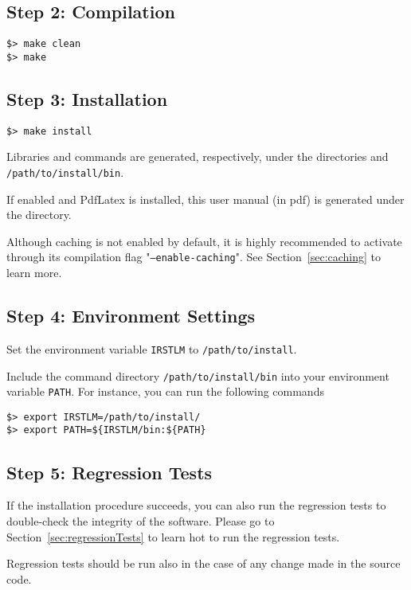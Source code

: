 \subsection{Step 2: Compilation}

\begin{verbatim}
$> make clean
$> make
\end{verbatim}

\subsection{Step 3: Installation}
\begin{verbatim}
$> make install
\end{verbatim}

\noindent
Libraries and commands are generated,  respectively, under the directories and {\tt /path/to/install/bin}.

\noindent
If enabled and PdfLatex is installed, this user manual (in pdf) is generated under the directory.

\noindent
Although caching is not enabled by default, it is highly recommended to activate through its compilation flag "{\tt --enable-caching}". See Section~\ref{sec:caching} to learn more.


\subsection{Step 4: Environment Settings}
Set the environment variable {\tt IRSTLM} to {\tt /path/to/install}.

\noindent
Include the command directory {\tt /path/to/install/bin} into your environment variable {\tt PATH}.
For instance, you can run the following commands

\begin{verbatim}
$> export IRSTLM=/path/to/install/
$> export PATH=${IRSTLM/bin:${PATH}
\end{verbatim}



\subsection{Step 5: Regression Tests}
If the installation procedure succeeds, you can also run the regression tests to double-check the integrity of the software.
Please go to Section~\ref{sec:regressionTests} to learn hot to run the regression tests.

\noindent Regression tests should be run also in the case of any change made in the source code.